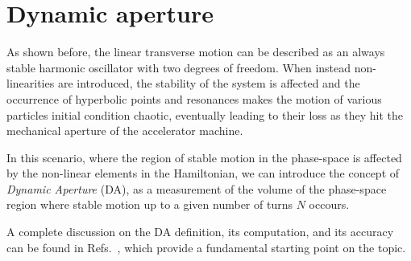 \section{Dynamic aperture}
\label{sec:2:dynamic_aperture}

As shown before, the linear transverse motion can be described as an always stable harmonic oscillator with two degrees of freedom. When instead non-linearities are introduced, the stability of the system is affected and the occurrence of hyperbolic points and resonances makes the motion of various particles initial condition chaotic, eventually leading to their loss as they hit the mechanical aperture of the accelerator machine.

In this scenario, where the region of stable motion in the phase-space is affected by the non-linear elements in the Hamiltonian, we can introduce the concept of \textit{Dynamic Aperture} (DA), as a measurement of the volume of the phase-space region where stable motion up to a given number of turns $N$ occours.

A complete discussion on the DA definition, its computation, and its accuracy can be found in Refs.~\cite{PhysRevE.53.4067, invlog}, which provide a fundamental starting point on the topic.

